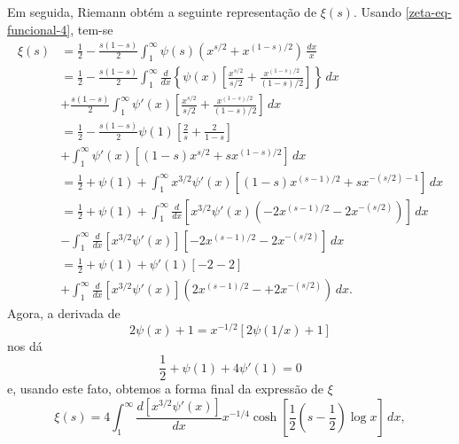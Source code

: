     Em seguida, Riemann obtém a seguinte representação de $\xi(s)$. Usando \eqref{zeta-eq-funcional-4}, tem-se 
    \begin{align*}
        \xi(s) &= \frac{1}{2} - \frac{s(1-s)}{2} \int_{1}^{\infty} \psi(s) (x^{s/2} + x^{(1-s)/2}) \, \frac{dx}{x} \\[0.3cm]
        &= \frac{1}{2} - \frac{s(1-s)}{2} \int_{1}^{\infty} \frac{d}{dx} \left\{ \psi(x) \left[ \frac{x^{s/2}}{s/2} + \frac{x^{(1-s)/2}}{(1-s)/2} \right] \right\} \, dx \\[0.3cm]
        &+ \frac{s(1-s)}{2} \int_{1}^{\infty} \psi'(x) \left[ \frac{x^{s/2}}{s/2} + \frac{x^{(1-s)/2}}{(1-s)/2} \right]  \, dx \\[0.3cm]
        &= \frac{1}{2} - \frac{s(1-s)}{2} \psi(1) \left[ \frac{2}{s} + \frac{2}{1-s} \right] \\[0.3cm]
        &+ \int_{1}^{\infty} \psi'(x) \left[ (1-s) x^{s/2} + s x^{(1-s)/2} \right]  \, dx \\[0.3cm]
        &= \frac{1}{2} + \psi(1) + \int_{1}^{\infty} x^{3/2} \psi'(x) \left[(1-s) x^{(s-1)/2} + s x^{-(s/2) - 1} \right] \, dx \\[0.3cm]
        &= \frac{1}{2} + \psi(1) + \int_{1}^{\infty} \frac{d}{dx} [x^{3/2} \psi'(x) (-2 x^{(s-1)/2} -2 x^{-(s/2)} )] \, dx \\[0.3cm]
        &- \int_{1}^{\infty} \frac{d}{dx} [x^{3/2} \psi'(x)] [-2 x^{(s-1)/2} -2 x^{-(s/2)} ] \, dx \\[0.3cm]
        &= \frac{1}{2} + \psi(1) + \psi'(1)[-2 -2] \\[0.3cm]
        &+ \int_{1}^{\infty} \frac{d}{dx} [x^{3/2} \psi'(x)] (2 x^{(s-1)/2} -+ 2 x^{-(s/2)} ) \, dx.
    \end{align*}
    Agora, a derivada de 
    \begin{equation*}
        2 \psi(x) + 1 = x^{-1/2}[ 2\psi(1/x) + 1]
    \end{equation*}
    nos dá
    \begin{equation*}
        \frac{1}{2} + \psi(1) + 4\psi'(1) = 0
    \end{equation*}
    e, usando este fato, obtemos a forma final da expressão de $\xi$
    \begin{equation}
        \label{xi(s)-2}
        \xi(s) = 4\int_{1}^{\infty} \frac{d[x^{3/2}\psi'(x)]}{dx} x^{-1/4} \cosh \left[ \frac{1}{2} \left( s - \frac{1}{2} \right) \log x \right] \, dx,
    \end{equation}

